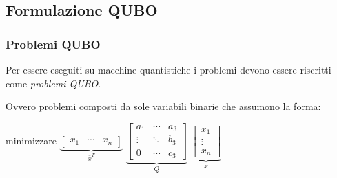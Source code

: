 \documentclass[10pt]{beamer}
\begin{document}
\subsection{Formulazione QUBO}
\begin{frame}
  \frametitle{Problemi QUBO}

  Per essere eseguiti su macchine quantistiche i problemi devono essere riscritti come \emph{problemi QUBO}.

  Ovvero problemi composti da sole variabili binarie che assumono la forma:

  \begin{center}
    minimizzare 
    $\underbrace{\begin{bmatrix}
        x_1 & \cdots & x_n 
    \end{bmatrix}}_{\bar{x}^T}$ 
    $\underbrace{\begin{bmatrix}
        a_1 & \cdots & a_3 \\
        \vdots & \ddots & b_3 \\
        0 & \cdots & c_3 
    \end{bmatrix}}_{Q}$ 
    $\underbrace{\begin{bmatrix}
        x_1 \\
        \vdots \\
        x_n 
    \end{bmatrix}}_{\bar{x}}$       
  \end{center}


\end{frame}
\end{document}
